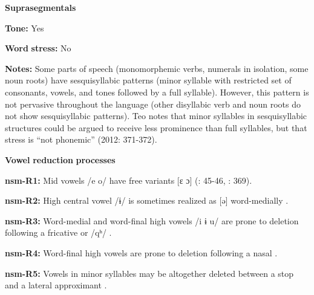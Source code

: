\documentclass[output=paper]{langsci/langscibook}
\begin{document}
\begin{styleBody}
\textbf{Suprasegmentals}
\end{styleBody}

\begin{styleBody}
\textbf{Tone:} Yes
\end{styleBody}

\begin{styleBody}
\textbf{Word} \textbf{stress:} No
\end{styleBody}

\begin{styleBody}
\textbf{Notes:} Some parts of speech (monomorphemic verbs, numerals in isolation, some noun roots) have sesquisyllabic patterns  (minor syllable with restricted set of consonants, vowels, and tones followed by a full syllable). However, this pattern is not pervasive throughout the language (other disyllabic verb and noun roots do not show sesquisyllabic patterns). Teo notes that minor syllables in sesquisyllabic structures could be argued to receive less prominence than full syllables, but that stress is “not phonemic” (2012: 371-372).
\end{styleBody}

\begin{styleBody}
\textbf{Vowel} \textbf{reduction} \textbf{processes}
\end{styleBody}

\begin{styleBody}
\textbf{nsm-R1:} Mid vowels /e o/ have free variants [ɛ ɔ] (\citealt{Teo2009}: 45-46, \citealt{Teo2012}: 369).
\end{styleBody}

\begin{styleBody}
\textbf{nsm-R2:} High central vowel /ɨ/ is sometimes realized as [ə] word-medially \citep[45]{Teo2009}.
\end{styleBody}

\begin{styleBody}
\textbf{nsm-R3:} Word-medial and word-final high vowels /i ɨ u/ are prone to deletion following a fricative or /qʰ/ \citep[66]{Teo2009}.
\end{styleBody}

\begin{styleBody}
\textbf{nsm-R4:} Word-final high vowels are prone to deletion following a nasal \citep[369]{Teo2012}.
\end{styleBody}

\begin{styleBody}
\textbf{nsm-R5:} Vowels in minor syllables may be altogether deleted between a stop and a lateral approximant \citep[370]{Teo2012}.
\end{styleBody}
\end{document}
